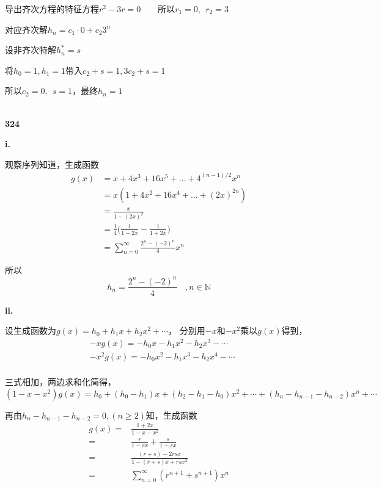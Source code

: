 \documentclass[UTF8]{ctexart}
\begin{document}
    导出齐次方程的特征方程$r^2-3r=0$~~~~所以$r_1=0,~~r_2=3$

    对应齐次解$h_n=c_1\cdot 0 +c_2 3^n$

    设非齐次特解$h_n^{\ast}=s$

    将$h_0=1,h_1=1$带入$c_2+s=1,3c_2+s=1$

    所以$c_2=0,~~s=1$，最终$h_n=1$

    ~\\
    \noindent\textbf{324}

    \textbf{i. }
    
    观察序列知道，生成函数
    \begin{equation*}
        \begin{aligned}
            g(x)
            &=x+4x^3+16x^5+\dots+4^{(n-1)/2}x^n\\
            &=x(1+4x^2+16x^4+\dots+(2x)^{2n})\\
            &=\frac{x}{1-(2x)^2}\\
            &=\frac{1}{4}\bigl(\frac{1}{1-2x}-\frac{1}{1+2x}\bigr)\\
            &=\sum_{n=0}^{\infty}\frac{2^n-(-2)^n}{4}x^n
        \end{aligned}
    \end{equation*}

    所以$$h_n=\frac{2^n-(-2)^n}{4}~~~~,n\in\mathbb{N} $$

    \textbf{ii. }

    设生成函数为$g(x) = h_0 + h_1 x + h_2 x^2 + \cdots$，
    分别用$-x$和$-x^2$乘以$g(x)$得到，
    \begin{equation*}
        \begin{aligned}
            & -xg(x) = -h_0x - h_1 x^2 - h_2 x^3 - \cdots \\
            & -x^2 g(x) = - h_0 x^2 - h_1 x^3 - h_2 x^4 - \cdots \\
        \end{aligned}
    \end{equation*}

    三式相加，两边求和化简得，
    $$ (1-x-x^2) g(x) = h_0 + (h_0 - h_1)x + (h_2 - h_1 - h_0) x^2 + \cdots + (h_n - h_{n-1}-h_{n-2})x^{n} + \cdots $$
    
    再由$h_n - h_{n-1} - h_{n-2} = 0, (n \ge 2)$知，生成函数
    \begin{equation*}
        \begin{aligned}
                g(x) =& \frac{1 + 2x}{1-x-x^2} \\
                =& \frac{r}{1-rx} + \frac{s}{1-sx} \\
                =& \frac{(r+s) -2rs x}{1-(r+s)x + rs x^2}\\
                =& \sum_{n=0}^{\infty} (r^{n+1} + s^{n+1}) x^n
        \end{aligned}
    \end{equation*}
\end{document}
